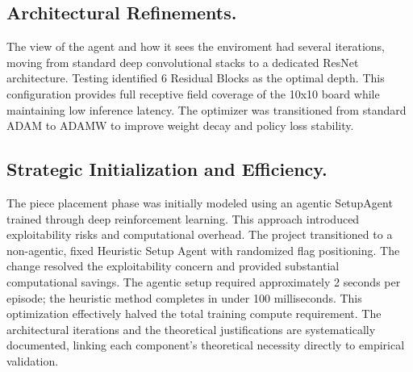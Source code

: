 \subsection{Architectural Refinements.} 
The view of the agent and how it sees the enviroment had several iterations, moving from standard deep convolutional stacks to a dedicated ResNet architecture. Testing identified 6 Residual Blocks as the optimal depth. This configuration provides full receptive field coverage of the 10x10 board while maintaining low inference latency. The optimizer was transitioned from standard ADAM to ADAMW to improve weight decay and policy loss stability.

\subsection{Strategic Initialization and Efficiency.} 
The piece placement phase was initially modeled using an agentic SetupAgent trained through deep reinforcement learning. This approach introduced exploitability risks and computational overhead. The project transitioned to a non-agentic, fixed Heuristic Setup Agent with randomized flag positioning. The change resolved the exploitability concern and provided substantial computational savings. The agentic setup required approximately 2 seconds per episode; the heuristic method completes in under 100 milliseconds. This optimization effectively halved the total training compute requirement. The architectural iterations and the theoretical justifications are systematically documented, linking each component's theoretical necessity directly to empirical validation.
